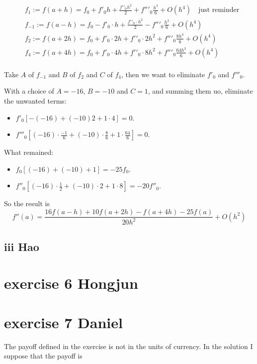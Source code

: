 \documentclass{article}
\begin{document}
\begin{align}
     & {{f}_{1}}:=f\left( a+h \right)={{f}_{0}}+f{{'}_{0}}h+\frac{f'{{'}_{0}}{{h}^{2}}}{2}+f''{{'}_{0}}\frac{{{h}^{3}}}{6}+O\left( {{h}^{4}} \right)\quad \text{just reminder} \\
     & {{f}_{-1}}:=f\left( a-h \right)={{f}_{0}}-f{{'}_{0}}\cdot h+\frac{f'{{'}_{0}}\cdot {{h}^{2}}}{2}-f''{{'}_{0}}\frac{{{h}^{3}}}{6}+O\left( {{h}^{4}} \right)              \\
     & {{f}_{2}}:=f\left( a+2h \right)={{f}_{0}}+f{{'}_{0}}\cdot 2h+f'{{'}_{0}}\cdot 2{{h}^{2}}+f''{{'}_{0}}\frac{8{{h}^{3}}}{6}+O\left( {{h}^{4}} \right)                     \\
     & {{f}_{4}}:=f\left( a+4h \right)={{f}_{0}}+f{{'}_{0}}\cdot 4h+f'{{'}_{0}}\cdot 8{{h}^{2}}+f''{{'}_{0}}\frac{64{{h}^{3}}}{6}+O\left( {{h}^{4}} \right)                    \\
\end{align}

Take $A$ of $f_{-1}$ and $B$ of $f_{2}$ and $C$ of $f_4$,
then we want to eliminate $f'_0$ and $f'''_0$.

With a choice of $A=-16$, $B=-10$ and $C=1$, and summing them uo, eliminate the unwanted terms:
\begin{itemize}
    \item $f'_0 [-(-16) + (-10)2 + 1\cdot 4] = 0$.
    \item $f'''_0 [(-16)\cdot \frac{-1}{6} + (-10)\cdot \frac{8}{6} + 1\cdot \frac{64}{6}] = 0$.
\end{itemize}
What remained:
\begin{itemize}
    \item $f_0 [(-16) + (-10) + 1] = -25f_0$.
    \item $f''_0 [(-16)\cdot \frac{1}{2} + (-10)\cdot 2 + 1\cdot 8] = -20f''_0$.
\end{itemize}

So the result is
\[f''\left( a \right)=\frac{16f\left( a-h \right)+10f\left( a+2h \right)-f\left( a+4h \right)-25f\left( a \right)}{20{{h}^{2}}}+O\left( {{h}^{2}} \right)\]
\subsection{iii Hao}

\section{exercise 6 Hongjun}

\section{exercise 7 Daniel}
The payoff defined in the exercise is not in the units of currency. In the solution I suppose that the payoff is
\end{document}
